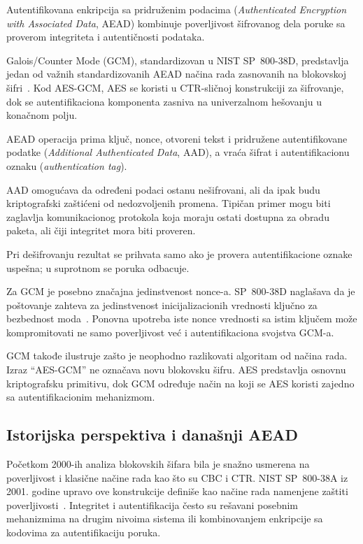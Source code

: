 Autentifikovana enkripcija sa pridruženim podacima
(\emph{Authenticated Encryption with Associated Data}, AEAD)
kombinuje poverljivost šifrovanog dela poruke sa proverom integriteta i
autentičnosti podataka.

Galois/Counter Mode (GCM), standardizovan u NIST SP~800-38D,
predstavlja jedan od važnih standardizovanih AEAD načina rada
zasnovanih na blokovskoj šifri~\cite{sp800-38d}. Kod AES-GCM, AES se koristi u CTR-sličnoj
konstrukciji za šifrovanje, dok se autentifikaciona komponenta zasniva
na univerzalnom hešovanju u konačnom polju.

AEAD operacija prima ključ, nonce, otvoreni tekst i pridružene
autentifikovane podatke (\emph{Additional Authenticated Data}, AAD),
a vraća šifrat i autentifikacionu oznaku (\emph{authentication tag}).

AAD omogućava da određeni podaci ostanu nešifrovani, ali da ipak budu
kriptografski zaštićeni od nedozvoljenih promena. Tipičan primer mogu
biti zaglavlja komunikacionog protokola koja moraju ostati dostupna za
obradu paketa, ali čiji integritet mora biti proveren.

Pri dešifrovanju rezultat se prihvata samo ako je provera
autentifikacione oznake uspešna; u suprotnom se poruka odbacuje.

Za GCM je posebno značajna jedinstvenost nonce-a. SP~800-38D naglašava
da je poštovanje zahteva za jedinstvenost inicijalizacionih vrednosti
ključno za bezbednost moda~\cite{sp800-38d}. Ponovna upotreba iste
nonce vrednosti sa istim ključem može kompromitovati ne samo
poverljivost već i autentifikaciona svojstva GCM-a.

GCM takođe ilustruje zašto je neophodno razlikovati algoritam od načina
rada. Izraz ``AES-GCM'' ne označava novu blokovsku šifru. AES predstavlja
osnovnu kriptografsku primitivu, dok GCM određuje način na koji se AES
koristi zajedno sa autentifikacionim mehanizmom.


\subsection{Istorijska perspektiva i današnji AEAD}
\label{subsec:istorijska_aead}

Početkom 2000-ih analiza blokovskih šifara bila je snažno usmerena na
poverljivost i klasične načine rada kao što su CBC i CTR. NIST
SP~800-38A iz 2001. godine upravo ove konstrukcije definiše kao načine
rada namenjene zaštiti poverljivosti~\cite{sp800-38a}. Integritet i
autentifikacija često su rešavani posebnim mehanizmima na drugim
nivoima sistema ili kombinovanjem enkripcije sa kodovima za
autentifikaciju poruka.


